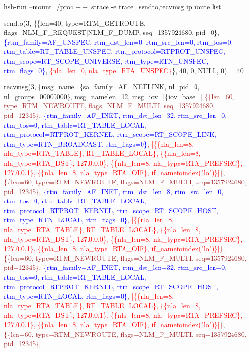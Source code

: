 \documentclass[unicode]{beamer}
\begin{document}
\begin{frame}[fragile]{\small hsh-run --mount=/proc $--$ strace -e trace=sendto,recvmsg ip route list}

{\texttt\tiny
\fontsize{4pt}{4pt}\selectfont
sendto(3, \{\{len=40, type=RTM\_GETROUTE, flags=NLM\_F\_REQUEST|NLM\_F\_DUMP, seq=1357924680, pid=0\},
 \textcolor{blue}{\{rtm\_family=AF\_UNSPEC, rtm\_dst\_len=0, rtm\_src\_len=0, rtm\_tos=0, rtm\_table=RT\_TABLE\_UNSPEC, rtm\_protocol=RTPROT\_UNSPEC, rtm\_scope=RT\_SCOPE\_UNIVERSE, rtm\_type=RTN\_UNSPEC, rtm\_flags=0\}},
  \textcolor{red}{\{nla\_len=0, nla\_type=RTA\_UNSPEC\}}\}, 40, 0, NULL, 0) = 40

recvmsg(3, \{msg\_name=\{sa\_family=AF\_NETLINK, nl\_pid=0, nl\_groups=00000000\}, msg\_namelen=12, msg\_iov=[\{iov\_base=[
\textcolor{brown}{\{\{len=60, type=RTM\_NEWROUTE, flags=NLM\_F\_MULTI, seq=1357924680, pid=12345\},
 \textcolor{blue}{\{rtm\_family=AF\_INET, rtm\_dst\_len=32, rtm\_src\_len=0, rtm\_tos=0, rtm\_table=RT\_TABLE\_LOCAL, rtm\_protocol=RTPROT\_KERNEL, rtm\_scope=RT\_SCOPE\_LINK, rtm\_type=RTN\_BROADCAST, rtm\_flags=0\}},
  \textcolor{red}{[\{\{nla\_len=8, nla\_type=RTA\_TABLE\}, RT\_TABLE\_LOCAL\}, \{\{nla\_len=8, nla\_type=RTA\_DST\}, 127.0.0.0\}, \{\{nla\_len=8, nla\_type=RTA\_PREFSRC\}, 127.0.0.1\}, \{\{nla\_len=8, nla\_type=RTA\_OIF\}, if\_nametoindex("lo")\}]}\}},
\textcolor{brown}{\{\{len=60, type=RTM\_NEWROUTE, flags=NLM\_F\_MULTI, seq=1357924680, pid=12345\},
 \textcolor{blue}{\{rtm\_family=AF\_INET, rtm\_dst\_len=8, rtm\_src\_len=0, rtm\_tos=0, rtm\_table=RT\_TABLE\_LOCAL, rtm\_protocol=RTPROT\_KERNEL, rtm\_scope=RT\_SCOPE\_HOST, rtm\_type=RTN\_LOCAL, rtm\_flags=0\}},
  \textcolor{red}{[\{\{nla\_len=8, nla\_type=RTA\_TABLE\}, RT\_TABLE\_LOCAL\}, \{\{nla\_len=8, nla\_type=RTA\_DST\}, 127.0.0.0\}, \{\{nla\_len=8, nla\_type=RTA\_PREFSRC\}, 127.0.0.1\}, \{\{nla\_len=8, nla\_type=RTA\_OIF\}, if\_nametoindex("lo")\}]}\}},
\textcolor{brown}{\{\{len=60, type=RTM\_NEWROUTE, flags=NLM\_F\_MULTI, seq=1357924680, pid=12345\},
 \textcolor{blue}{\{rtm\_family=AF\_INET, rtm\_dst\_len=32, rtm\_src\_len=0, rtm\_tos=0, rtm\_table=RT\_TABLE\_LOCAL, rtm\_protocol=RTPROT\_KERNEL, rtm\_scope=RT\_SCOPE\_HOST, rtm\_type=RTN\_LOCAL, rtm\_flags=0\}},
  \textcolor{red}{[\{\{nla\_len=8, nla\_type=RTA\_TABLE\}, RT\_TABLE\_LOCAL\}, \{\{nla\_len=8, nla\_type=RTA\_DST\}, 127.0.0.1\}, \{\{nla\_len=8, nla\_type=RTA\_PREFSRC\}, 127.0.0.1\}, \{\{nla\_len=8, nla\_type=RTA\_OIF\}, if\_nametoindex("lo")\}]}\}},
\textcolor{brown}{\{\{len=60, type=RTM\_NEWROUTE, flags=NLM\_F\_MULTI, seq=1357924680, pid=12345\},
}}
\end{frame}
\end{document}
